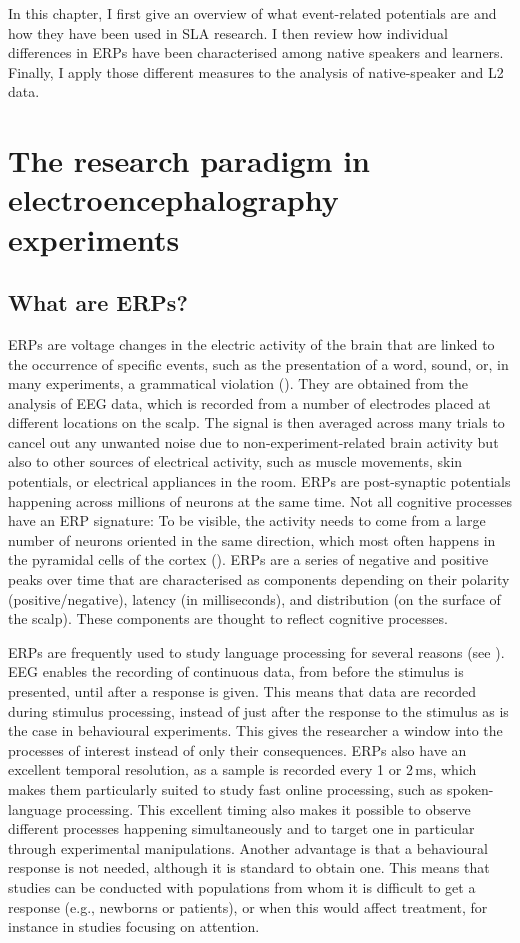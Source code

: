 \documentclass[output=paper,colorlinks,citecolor=brown,modfonts,nonflat]{../langscibook}
\begin{document}
In this chapter, I first give an overview of what event-related potentials are and how they have been used in SLA research. I then review how individual differences in ERPs have been characterised among native speakers and learners. Finally, I apply those different measures to the analysis of native-speaker and L2 data. 

\largerpage
\section{The research paradigm in electroencephalography experiments}

\subsection{What are ERPs?}
ERPs are voltage changes in the electric activity of the brain that are linked to the occurrence of specific events, such as the presentation of a word, sound, or, in many experiments,  a grammatical violation (\citealt{FabianiEtAl2007,HellTokowicz2010}). They are obtained from the analysis of EEG data, which is recorded from a number of electrodes placed at different locations on the scalp. The signal is then averaged across many trials to cancel out any unwanted noise due to non-experiment-related brain activity but also to other sources of electrical activity, such as muscle movements, skin potentials, or electrical appliances in the room. ERPs are post-synaptic potentials happening across millions of neurons at the same time. Not all cognitive processes have an ERP signature: To be visible, the activity needs to come from a large number of neurons oriented in the same direction, which most often happens in the pyramidal cells of the cortex (\citealt{OsterhoutEtAl2004,Luck2014}). ERPs are a series of negative and positive peaks over time that are characterised as components depending on their polarity (positive/negative), latency (in milliseconds), and distribution (on the surface of the scalp). These components are thought to reflect cognitive processes.

ERPs are frequently used to study language processing for several reasons (see \citealt{Kaan2007,Luck2014}). EEG enables the recording of continuous data, from before the stimulus is presented, until after a response is given. This means that data are recorded during stimulus processing, instead of just after the response to the stimulus as is the case in behavioural experiments. This gives the researcher a window into the processes of interest instead of only their consequences. ERPs also have an excellent temporal resolution, as a sample is recorded every 1 or 2\,ms, which makes them particularly suited to study fast online processing, such as spoken-language processing. This excellent timing also makes it possible to observe different processes happening simultaneously and to target one in particular through experimental manipulations. Another advantage is that a behavioural response is not needed, although it is standard to obtain one. This means that studies can be conducted with populations from whom it is difficult to get a response (e.g., newborns or patients), or when this would affect treatment, for instance in studies focusing on attention.
\end{document}
